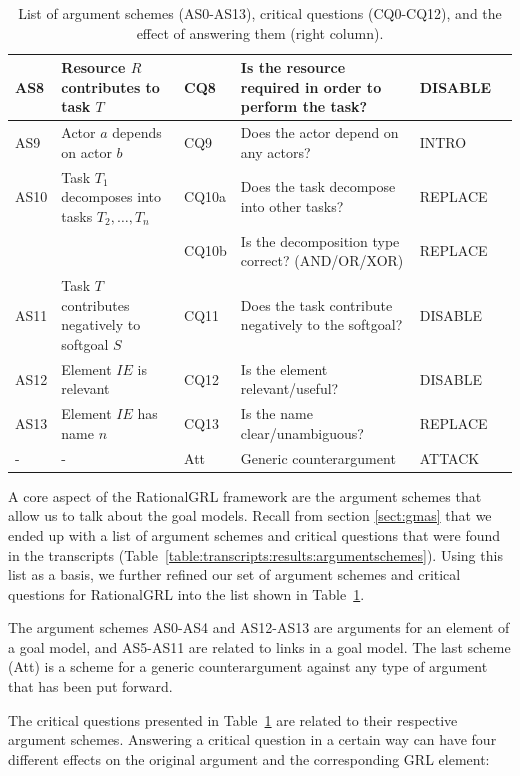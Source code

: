 \begin{table}[t]
\begin{tabularx}{\textwidth}{|l|l|l|X|l|l|}
\hline
AS8 & Resource $R$ contributes to task $T$ & CQ8 & Is the resource required in order to perform the task?& DISABLE\\
\hline
AS9 & Actor $a$ depends on actor $b$ & CQ9 & Does the actor depend on any actors?& INTRO\\
\hline
AS10 & Task $T_1$ decomposes into tasks $T_2,\ldots,T_n$ & CQ10a & Does the task decompose into other tasks?& REPLACE\\
 &  & CQ10b & Is the decomposition type correct? (AND/OR/XOR)& REPLACE\\
\hline
AS11 & Task $T$ contributes negatively to softgoal $S$& CQ11 & Does the task contribute negatively to the softgoal?& DISABLE\\
\hline
\hline
AS12 & Element $IE$ is relevant & CQ12 & Is the element relevant/useful? & DISABLE\\
\hline
AS13 & Element $IE$ has name $n$ & CQ13 & Is the name clear/unambiguous? & REPLACE\\
\hline
\hline
- & - & Att & Generic counterargument & ATTACK\\
\hline
\end{tabularx}
\caption{List of argument schemes (AS0-AS13), critical questions (CQ0-CQ12), and the effect of answering them (right column).}
\label{table:argument-schemes}
\end{table}

A core aspect of the RationalGRL framework are the argument schemes that allow us to talk about the goal models. Recall from section \ref{sect:gmas} that we ended up with a list of argument schemes and critical questions that were found in the transcripts (Table~\ref{table:transcripts:results:argumentschemes}). Using this list as a basis, we further refined our set of argument schemes and critical questions for RationalGRL into the list shown in Table~\ref{table:argument-schemes}. 

The argument schemes AS0-AS4 and AS12-AS13 are arguments for an element of a goal model, and AS5-AS11 are related to links in a goal model. The last scheme (Att) is a scheme for a generic counterargument against any type of argument that has been put forward. 

The critical questions presented in Table~\ref{table:argument-schemes} are related to their respective argument schemes. Answering a critical question in a certain way can have four different effects on the original argument and the corresponding GRL element:


